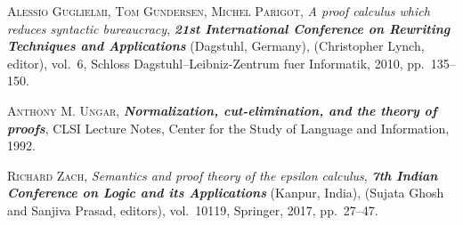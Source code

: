 \documentclass[bsl,meeting]{asl}
\begin{document}
\begin{thebibliography}{10}


{\scshape Alessio Guglielmi, Tom Gundersen, Michel Parigot},
{\itshape A proof calculus which reduces syntactic bureaucracy},
{\bfseries\itshape 21st International Conference on Rewriting Techniques and Applications}
(Dagstuhl, Germany),
(Christopher Lynch, editor),
vol.~6,
Schloss Dagstuhl--Leibniz-Zentrum fuer Informatik,
2010,
pp.~135--150.

{\scshape Anthony M. Ungar},
{\bfseries\itshape Normalization, cut-elimination, and the theory of proofs},
CLSI Lecture Notes,
Center for the Study of Language and Information,
1992.

{\scshape Richard Zach},
{\itshape Semantics and proof theory of the epsilon calculus},
{\bfseries\itshape 7th Indian Conference on Logic and its Applications}
(Kanpur, India),
(Sujata Ghosh and Sanjiva Prasad, editors),
vol.~10119,
Springer,
2017,
pp.~27--47.
\end{thebibliography}


\vspace*{-0.5\baselineskip}
\end{document}
